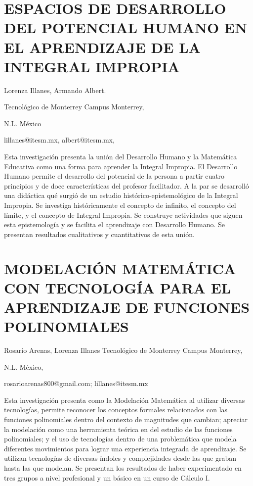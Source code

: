 \section{\uppercase{ Espacios de Desarrollo del Potencial Humano en EL APRENDIZAJE
DE LA INTEGRAL IMPROPIA}}

\begin{datos}

Lorenza Illanes, Armando Albert.

Tecnológico de Monterrey Campus Monterrey, 

N.L. México

lillanes@itesm.mx, albert@itesm.mx,

\end{datos}

Esta investigación presenta la unión del Desarrollo Humano y la Matemática
Educativa como una forma para aprender la Integral Impropia. El Desarrollo
Humano permite el desarrollo del potencial de la persona a partir
cuatro principios y de doce características del profesor facilitador.
A la par se desarrolló una didáctica qué surgió de un estudio histórico-epistemológico
de la Integral Impropia. Se investiga históricamente el concepto de
infinito, el concepto del límite, y el concepto de Integral Impropia.
Se construye actividades que siguen esta epistemología y se facilita
el aprendizaje con Desarrollo Humano. Se presentan resultados cualitativos
y cuantitativos de esta unión. 


\section{\uppercase{ MODELACIÓN Matemática con tecnología para EL APRENDIZAJE
de funciones POLINOMIALES}}

\begin{datos}

Rosario Arenas, Lorenza Illanes Tecnológico de Monterrey Campus Monterrey,

N.L. México,

rosarioarenas800@gmail.com; lillanes@itesm.mx 

\end{datos}

Esta investigación presenta como la Modelación Matemática al utilizar
diversas tecnologías, permite reconocer los conceptos formales relacionados
con las funciones polinomiales dentro del contexto de magnitudes que
cambian; apreciar la modelación como una herramienta teórica en del
estudio de las funciones polinomiales; y el uso de tecnologías dentro
de una problemática que modela diferentes movimientos para lograr
una experiencia integrada de aprendizaje. Se utilizan tecnologías
de diversas índoles y complejidades desde las que graban hasta las
que modelan. Se presentan los resultados de haber experimentado en
tres grupos a nivel profesional y un básico en un curso de Cálculo
I.


